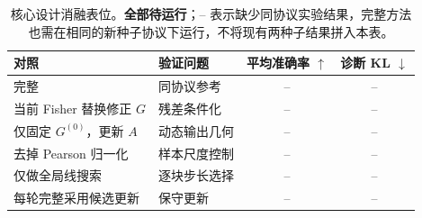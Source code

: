 \begin{table}[!htbp]
  \centering
  \caption{核心设计消融表位。\textbf{全部待运行}；-- 表示缺少同协议实验结果，完整方法也需在相同的新种子协议下运行，不将现有两种子结果拼入本表。}
  \label{tab:ink-core-ablation}
  \small
  \setlength{\tabcolsep}{4pt}
  \renewcommand{\arraystretch}{1.35}
  \begin{tabularx}{\linewidth}{@{}X X cc@{}}
    \toprule
    对照 & 验证问题 & 平均准确率 $\uparrow$ & 诊断 KL $\downarrow$ \\
    \midrule
    \rowcolor{black!8}
    完整 \method{} & 同协议参考 & -- & -- \\
    当前 Fisher 替换修正 $G$ & 残差条件化 & -- & -- \\
    仅固定 $G^{(0)}$，更新 $A$ & 动态输出几何 & -- & -- \\
    去掉 Pearson 归一化 & 样本尺度控制 & -- & -- \\
    仅做全局线搜索 & 逐块步长选择 & -- & -- \\
    每轮完整采用候选更新 & 保守更新 & -- & -- \\
    \bottomrule
  \end{tabularx}
\end{table}
